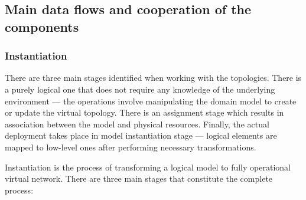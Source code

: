 \documentclass[11pt]{book}
\begin{document}
          \noindent
          \begin{minipage}{\textwidth}
            
          \end{minipage}


      \subsection{Main data flows and cooperation of the components}

        \subsubsection{Instantiation}

          There are three main stages identified when working with the topologies. There is a purely logical one that
          does not require any knowledge of the underlying environment --- the operations involve manipulating the
          domain model to create or update the virtual topology. There is an assignment stage which results in
          association between the model and physical resources. Finally, the actual deployment takes place in model
          instantiation stage --- logical elements are mapped to low-level ones after performing necessary
          transformations.

          Instantiation is the process of transforming a logical model to fully operational virtual network. There are
          three main stages that constitute the complete process:
\end{document}
